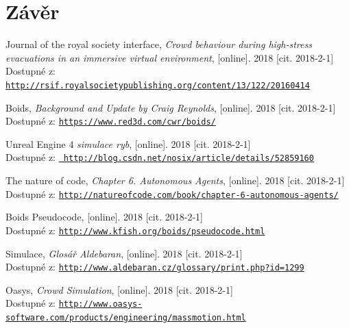 \documentclass[czech,public,dept460,male,cpdeclaration]{diploma}
\begin{document}
\section{Závěr}


\begin{thebibliography}{99}
	
	 Journal of the royal society interface, 
		\textit{Crowd behaviour during high-stress evacuations in an immersive virtual environment}, [online]. 2018 [cit. 2018-2-1]\\
		Dostupné z: \href{http://rsif.royalsocietypublishing.org/content/13/122/20160414}{\texttt{http://rsif.royalsocietypublishing.org/content/13/122/20160414}}
	
	 Boids, 
		\textit{Background and Update by Craig Reynolds}, [online]. 2018 [cit. 2018-2-1]\\
		Dostupné z: \href{https://www.red3d.com/cwr/boids/}{\texttt{https://www.red3d.com/cwr/boids/}}
	
	 Unreal Engine 4 \textit{simulace ryb}, [online]. 2018 [cit. 2018-2-1]\\
		Dostupné z: \href{		http://blog.csdn.net/nosix/article/details/52859160}{\texttt{		http://blog.csdn.net/nosix/article/details/52859160}}
	
	 The nature of code, 
		\textit{Chapter 6. Autonomous Agents}, [online]. 2018 [cit. 2018-2-1]\\
		Dostupné z: \href{http://natureofcode.com/book/chapter-6-autonomous-agents/}{\texttt{http://natureofcode.com/book/chapter-6-autonomous-agents/}}

	 Boids Pseudocode, 
		[online]. 2018 [cit. 2018-2-1]\\
		Dostupné z: \href{http://www.kfish.org/boids/pseudocode.html}{\texttt{http://www.kfish.org/boids/pseudocode.html}}
		
	 Simulace,
		\textit{Glosář Aldebaran}, [online]. 2018 [cit. 2018-2-1]\\
		Dostupné z: \href{http://www.aldebaran.cz/glossary/print.php?id=1299}{\texttt{http://www.aldebaran.cz/glossary/print.php?id=1299}}
		
	 Oasys,
		\textit{Crowd Simulation}, [online]. 2018 [cit. 2018-2-1]\\
		Dostupné z: \href{http://www.oasys-software.com/products/engineering/massmotion.html}{\texttt{http://www.oasys-software.com/products/engineering/massmotion.html}}
		

\end{thebibliography}
\end{document}
